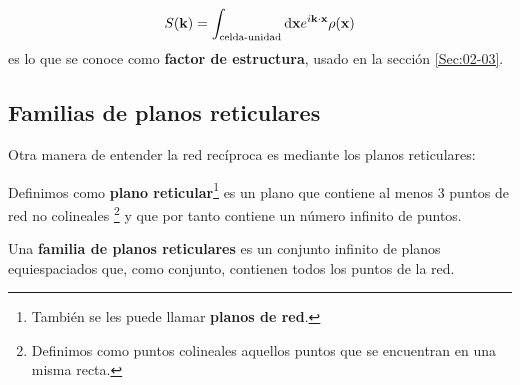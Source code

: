 \begin{equation}
	S(\mathbf{k}) = \int_{\text{celda-unidad}} \mathrm{d} \mathbf{x} e^{i \mathbf{k} \cdot \mathbf{x}} \rho (\mathbf{x})
\end{equation}	
es lo que se conoce como \textbf{factor de estructura}, usado en la sección \ref{Sec:02-03}.

\subsection{Familias de planos reticulares}

Otra manera de entender la red recíproca es mediante los planos reticulares:

\begin{definition}  %
	Definimos como \textbf{plano reticular}\footnote{También se les puede llamar \textbf{planos de red}.} es un plano que contiene al menos 3 puntos de red no colineales \footnote{Definimos como puntos colineales aquellos puntos que se encuentran en una misma recta.} y que por tanto contiene un número infinito de puntos.
\end{definition}
\begin{definition} %
	Una \textbf{familia de planos reticulares} es un conjunto infinito de planos equiespaciados que, como conjunto, contienen todos los puntos de la red.
\end{definition}

